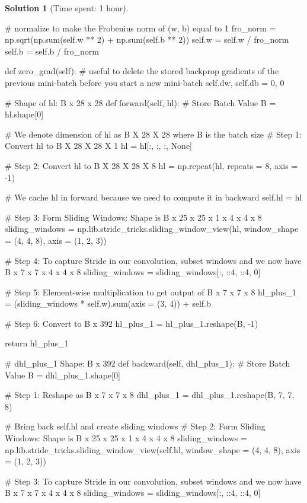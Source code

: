 \documentclass[11pt, reqno, letterpaper, twoside]{amsart}
\theoremstyle{plain}
\theoremstyle{definition}
\newtheorem{solution}[theorem]{Solution}
\begin{document}
\begin{solution}[Time spent: 1 hour]
\begin{enumerate}
\begin{python}
        # normalize to make the Frobenius norm of (w, b) equal to 1
        fro_norm = np.sqrt(np.sum(self.w ** 2) + np.sum(self.b ** 2))
        self.w = self.w / fro_norm
        self.b = self.b / fro_norm
    
    def zero_grad(self):
        # useful to delete the stored backprop gradients of the previous mini-batch before you start a new mini-batch
        self.dw, self.db = 0, 0

    # Shape of hl: B x 28 x 28
    def forward(self, hl):
        # Store Batch Value
        B = hl.shape[0]

        # We denote dimension of hl as B X 28 X 28 where B is the batch size
        # Step 1: Convert hl to B X 28 X 28 X 1
        hl = hl[:, :, :, None]

        # Step 2: Convert hl to B X 28 X 28 X 8
        hl = np.repeat(hl, repeats = 8, axis = -1)

        # We cache hl in forward because we need to compute it in backward
        self.hl = hl

        # Step 3: Form Sliding Windows: Shape is B x 25 x 25 x 1 x 4 x 4 x 8
        sliding_windows = np.lib.stride_tricks.sliding_window_view(hl, window_shape = (4, 4, 8), axis = (1, 2, 3))
        
        # Step 4: To capture Stride in our convolution, subset windows and we now have B x 7 x 7 x 4 x 4 x 8
        sliding_windows = sliding_windows[:, ::4, ::4, 0]

        # Step 5: Element-wise multiplication to get output of B x 7 x 7 x 8
        hl_plus_1 = (sliding_windows * self.w).sum(axis = (3, 4)) + self.b

        # Step 6: Convert to B x 392
        hl_plus_1 = hl_plus_1.reshape(B, -1)

        return hl_plus_1
    
    # dhl_plus_1 Shape: B x 392
    def backward(self, dhl_plus_1):
        # Store Batch Value
        B = dhl_plus_1.shape[0]

        # Step 1: Reshape as B x 7 x 7 x 8
        dhl_plus_1 = dhl_plus_1.reshape(B, 7, 7, 8)

        # Bring back self.hl and create sliding windows
        # Step 2: Form Sliding Windows: Shape is B x 25 x 25 x 1 x 4 x 4 x 8
        sliding_windows = np.lib.stride_tricks.sliding_window_view(self.hl, window_shape = (4, 4, 8), axis = (1, 2, 3))
        
        # Step 3: To capture Stride in our convolution, subset windows and we now have B x 7 x 7 x 4 x 4 x 8
        sliding_windows = sliding_windows[:, ::4, ::4, 0]


\end{python}
\end{enumerate}
\end{solution}
\end{document}
